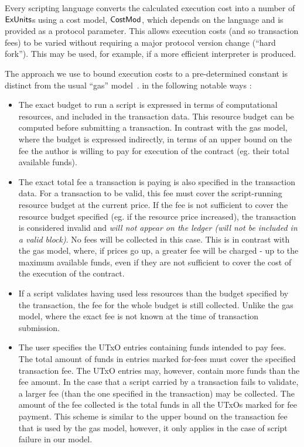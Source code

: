 Every scripting language
converts the calculated execution cost into a number of $\mathsf{ExUnits}$s using a cost model,
$\mathsf{CostMod}$, which depends on the language and is provided as a protocol parameter.
This allows execution costs (and so transaction fees) to be varied without requiring a major protocol version change (``hard fork'').
This may be used, for example, if a more efficient interpreter is produced.

The approach we use to bound execution costs to a pre-determined constant is
distinct from the usual ``gas'' model~\cite{XX}. in the following notable ways :

\begin{itemize}
  \item The exact budget to run a script is expressed in terms of computational resources,
  and included in the transaction data. This resource budget can be computed before submitting a transaction.
  In contrast with the gas model, where the budget is expressed indirectly,
  in terms of an upper bound on the fee the author is willing to pay for execution of the
  contract (eg. their total available funds).

  \item The exact total fee a transaction is paying is also specified in the transaction data.
  For a transaction to be valid, this fee must cover the script-running resource budget at the current price.
  If the fee is not sufficient to cover the resource budget specified (eg. if the resource price increased),
  the transaction is considered invalid and \emph{will not appear on the ledger (will not be included in a valid block)}.
  No fees will be collected in this case.
  This is in contrast with the gas model, where, if prices go up, a greater fee will be charged - up to
  the maximum available funds, even if they are not sufficient to cover the cost of the execution of the contract.

  \item If a script validates having used less resources than the budget specified by the
  transaction, the fee for the whole budget is still collected. Unlike the gas model, where
  the exact fee is not known at the time of transaction submission.

  \item The user specifies the UTxO entries containing funds intended to pay fees.
  The total amount of funds in entries marked for-fees must cover the specified transaction fee.
  The UTxO entries may, however, contain more funds than the fee amount. In the case that a script carried by a transaction fails
  to validate, a larger fee (than the one specified in the transaction) may be collected.
  The amount of the fee collected is the total funds in all the UTxOs marked for fee payment.
  This scheme is similar to the upper bound on the transaction fee that is used by the gas model,
  however, it only applies in the case of script failure in our model.
\end{itemize}

